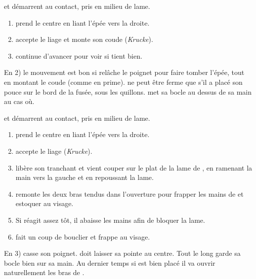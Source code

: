 \begin{exercice}
\label{épée-bocle:I33:ex:krucke-liage}

\A et \D démarrent au contact, pris en milieu de lame.

\begin{enumerate}
	\item \A prend le centre en liant l'épée vers la droite.
	\item \D accepte le liage et monte son coude (\emph{Krucke}).
	\item \A continue d'avancer pour voir si \D tient bien.
\end{enumerate}

En 2) le mouvement est bon si \D relâche le poignet pour faire tomber l'épée, tout en montant le coude (comme en prime).
\D ne peut être ferme que s'il a placé son pouce sur le bord de la fusée, sous les quillons.
\D met sa bocle au dessus de sa main au cas où.

\end{exercice}


\begin{technique}

\A et \D démarrent au contact, pris en milieu de lame.

\begin{enumerate}
	\item \A prend le centre en liant l'épée vers la droite.
	\item \D accepte le liage (\emph{Krucke}).
	\item \A libère son tranchant et vient couper sur le plat de la lame de \D, en ramenant la main vers la gauche et en repoussant la lame.
	\item \A remonte les deux bras tendus dans l'ouverture pour frapper les mains de \D et estoquer au visage.
	\item Si \D réagit assez tôt, il abaisse les mains afin de bloquer la lame.
	\item \A fait un coup de bouclier et frappe au visage.
\end{enumerate}

En 3) \A casse son poignet. \A doit laisser sa pointe au centre.
Tout le long \A garde sa bocle bien sur sa main.
Au dernier temps si \A est bien placé il va ouvrir naturellement les bras de \D.

\end{technique}


